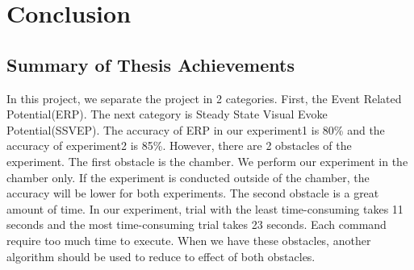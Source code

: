 \chapter{Conclusion}

\label{ch:conclusions}

\section{Summary of Thesis Achievements}

\hspace{1.5cm}In this project, we separate the project in 2 categories. First, the Event Related Potential(ERP). The next category is Steady State Visual Evoke Potential(SSVEP). The accuracy of ERP in our experiment1 is 80\% and the accuracy of experiment2 is 85\%. However, there are 2 obstacles of the experiment. The first obstacle is the chamber. We perform our experiment in the chamber only. If the experiment is conducted outside of the chamber, the accuracy will be lower for both experiments. The second obstacle is a great amount of time. In our experiment, trial with the least time-consuming takes 11 seconds and the most time-consuming trial takes 23 seconds. Each command require too much time to execute. When we have these obstacles, another algorithm should be used to reduce to effect of both obstacles.